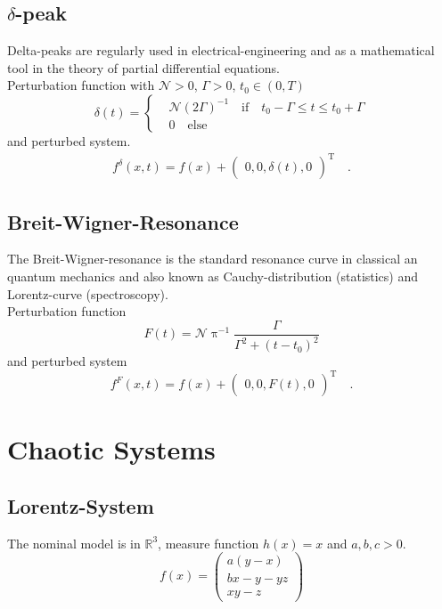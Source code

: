 \subsection{$\delta$-peak}
Delta-peaks are regularly used in electrical-engineering and as a mathematical tool in 
the theory of partial differential equations.\\

Perturbation function with $\mathcal{N} > 0$, $\Gamma > 0$, $t_0 \in (0,T)$
\begin{equation}
\delta(t) = \begin{cases}
& \mathcal{N} (2 \Gamma)^{-1} \quad \text{if} \quad t_0 -\Gamma \leq t \leq t_0 + \Gamma \\
& 0 \quad \text{else}
\end{cases}
\end{equation}
and perturbed system.
\begin{align}
f^\delta(x,t) = f(x) + \begin{pmatrix}
0 , 0 , \delta(t) , 0
\end{pmatrix}^\text{T} \quad .
\end{align}

\subsection{Breit-Wigner-Resonance}
The Breit-Wigner-resonance is the standard resonance curve in classical an quantum 
mechanics and also known as Cauchy-distribution (statistics) and Lorentz-curve 
(spectroscopy).\\

Perturbation function
\begin{equation}
F(t) = \mathcal{N} \uppi^{-1} \frac{\Gamma}{\Gamma^2 + (t-t_0)^2}
\end{equation}
and perturbed system
\begin{equation}
f^F(x,t) = f(x) +\begin{pmatrix}
0, 0, F(t) , 0
\end{pmatrix}^\text{T} \quad . 
\end{equation}


\section{Chaotic Systems}
\subsection{Lorentz-System}
The nominal model is in $\mathbb{R}^3$, measure function $h(x)=x$ and $a,b,c>0$. 
\begin{equation}
f(x) = \begin{pmatrix}
a (y-x) \\ bx -y -yz \\ xy - z
\end{pmatrix}
\end{equation}
